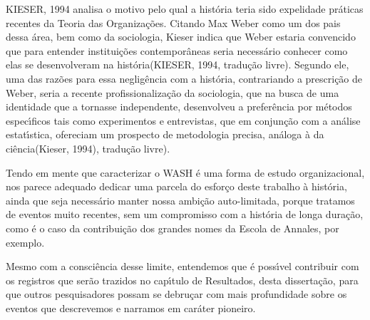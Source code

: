 \documentclass[
12pt,		%
openright,	%
twoside,  %
a4paper,			%
chapter=TITLE,		%
english,			%
french,				%
spanish,			%
brazil				%
]{USPSC-classe/USPSC}
\begin{document}
KIESER, 1994  analisa o motivo pelo qual a hist\'oria teria sido \textquotedbl expelida\textquotedbl  de pr\'aticas recentes da Teoria das Organiza\c{c}\~oes. Citando Max Weber como um dos pais dessa \'area, bem como da sociologia, Kieser indica que Weber estaria \textquotedbl convencido que para entender institui\c{c}\~oes contempor\^aneas seria necess\'ario conhecer como elas se desenvolveram na hist\'oria\textquotedbl   (KIESER, 1994, tradu\c{c}\~ao livre). Segundo ele, uma das raz\~oes para essa neglig\^encia com a hist\'oria, contrariando a prescri\c{c}\~ao de Weber, seria a recente profissionaliza\c{c}\~ao da sociologia, que na busca de uma identidade que a tornasse independente, desenvolveu a prefer\^encia por m\'etodos espec\'{\i}ficos tais como experimentos e entrevistas, que \textquotedbl em conjun\c{c}\~ao com a an\'alise estat\'{\i}stica, ofereciam um prospecto de metodologia precisa, an\'aloga \`a da ci\^encia\textquotedbl  (Kieser, 1994), tradu\c{c}\~ao livre).

















Tendo em mente que caracterizar o WASH \'e uma forma de estudo organizacional, nos parece adequado dedicar uma parcela do esfor\c{c}o deste trabalho \`a hist\'oria, ainda que seja necess\'ario manter nossa ambi\c{c}\~ao auto-limitada, porque tratamos de eventos muito recentes, sem um compromisso com a hist\'oria de longa dura\c{c}\~ao, como \'e o caso da contribui\c{c}\~ao dos grandes nomes da Escola de Annales, por exemplo.

















Mesmo com a consci\^encia desse limite, entendemos que \'e poss\'{\i}vel contribuir com os registros que ser\~ao trazidos no cap\'{\i}tulo de Resultados, desta disserta\c{c}\~ao, para que outros pesquisadores possam se debru\c{c}ar com mais profundidade sobre os eventos que descrevemos e narramos em car\'ater pioneiro.
\end{document}
